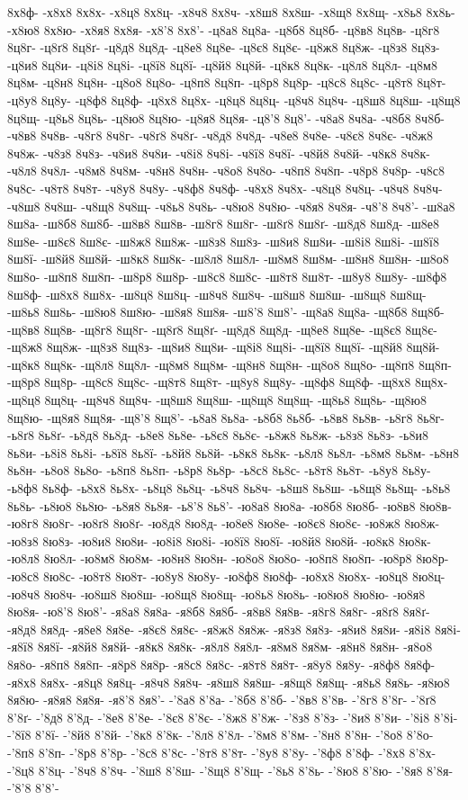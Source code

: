 {8х8ф-
-х8х8
8х8х-
-х8ц8
8х8ц-
-х8ч8
8х8ч-
-х8ш8
8х8ш-
-х8щ8
8х8щ-
-х8ь8
8х8ь-
-х8ю8
8х8ю-
-х8я8
8х8я-
-х8'8
8х8'-
-ц8а8
8ц8а-
-ц8б8
8ц8б-
-ц8в8
8ц8в-
-ц8г8
8ц8г-
-ц8ґ8
8ц8ґ-
-ц8д8
8ц8д-
-ц8е8
8ц8е-
-ц8є8
8ц8є-
-ц8ж8
8ц8ж-
-ц8з8
8ц8з-
-ц8и8
8ц8и-
-ц8і8
8ц8і-
-ц8ї8
8ц8ї-
-ц8й8
8ц8й-
-ц8к8
8ц8к-
-ц8л8
8ц8л-
-ц8м8
8ц8м-
-ц8н8
8ц8н-
-ц8о8
8ц8о-
-ц8п8
8ц8п-
-ц8р8
8ц8р-
-ц8с8
8ц8с-
-ц8т8
8ц8т-
-ц8у8
8ц8у-
-ц8ф8
8ц8ф-
-ц8х8
8ц8х-
-ц8ц8
8ц8ц-
-ц8ч8
8ц8ч-
-ц8ш8
8ц8ш-
-ц8щ8
8ц8щ-
-ц8ь8
8ц8ь-
-ц8ю8
8ц8ю-
-ц8я8
8ц8я-
-ц8'8
8ц8'-
-ч8а8
8ч8а-
-ч8б8
8ч8б-
-ч8в8
8ч8в-
-ч8г8
8ч8г-
-ч8ґ8
8ч8ґ-
-ч8д8
8ч8д-
-ч8е8
8ч8е-
-ч8є8
8ч8є-
-ч8ж8
8ч8ж-
-ч8з8
8ч8з-
-ч8и8
8ч8и-
-ч8і8
8ч8і-
-ч8ї8
8ч8ї-
-ч8й8
8ч8й-
-ч8к8
8ч8к-
-ч8л8
8ч8л-
-ч8м8
8ч8м-
-ч8н8
8ч8н-
-ч8о8
8ч8о-
-ч8п8
8ч8п-
-ч8р8
8ч8р-
-ч8с8
8ч8с-
-ч8т8
8ч8т-
-ч8у8
8ч8у-
-ч8ф8
8ч8ф-
-ч8х8
8ч8х-
-ч8ц8
8ч8ц-
-ч8ч8
8ч8ч-
-ч8ш8
8ч8ш-
-ч8щ8
8ч8щ-
-ч8ь8
8ч8ь-
-ч8ю8
8ч8ю-
-ч8я8
8ч8я-
-ч8'8
8ч8'-
-ш8а8
8ш8а-
-ш8б8
8ш8б-
-ш8в8
8ш8в-
-ш8г8
8ш8г-
-ш8ґ8
8ш8ґ-
-ш8д8
8ш8д-
-ш8е8
8ш8е-
-ш8є8
8ш8є-
-ш8ж8
8ш8ж-
-ш8з8
8ш8з-
-ш8и8
8ш8и-
-ш8і8
8ш8і-
-ш8ї8
8ш8ї-
-ш8й8
8ш8й-
-ш8к8
8ш8к-
-ш8л8
8ш8л-
-ш8м8
8ш8м-
-ш8н8
8ш8н-
-ш8о8
8ш8о-
-ш8п8
8ш8п-
-ш8р8
8ш8р-
-ш8с8
8ш8с-
-ш8т8
8ш8т-
-ш8у8
8ш8у-
-ш8ф8
8ш8ф-
-ш8х8
8ш8х-
-ш8ц8
8ш8ц-
-ш8ч8
8ш8ч-
-ш8ш8
8ш8ш-
-ш8щ8
8ш8щ-
-ш8ь8
8ш8ь-
-ш8ю8
8ш8ю-
-ш8я8
8ш8я-
-ш8'8
8ш8'-
-щ8а8
8щ8а-
-щ8б8
8щ8б-
-щ8в8
8щ8в-
-щ8г8
8щ8г-
-щ8ґ8
8щ8ґ-
-щ8д8
8щ8д-
-щ8е8
8щ8е-
-щ8є8
8щ8є-
-щ8ж8
8щ8ж-
-щ8з8
8щ8з-
-щ8и8
8щ8и-
-щ8і8
8щ8і-
-щ8ї8
8щ8ї-
-щ8й8
8щ8й-
-щ8к8
8щ8к-
-щ8л8
8щ8л-
-щ8м8
8щ8м-
-щ8н8
8щ8н-
-щ8о8
8щ8о-
-щ8п8
8щ8п-
-щ8р8
8щ8р-
-щ8с8
8щ8с-
-щ8т8
8щ8т-
-щ8у8
8щ8у-
-щ8ф8
8щ8ф-
-щ8х8
8щ8х-
-щ8ц8
8щ8ц-
-щ8ч8
8щ8ч-
-щ8ш8
8щ8ш-
-щ8щ8
8щ8щ-
-щ8ь8
8щ8ь-
-щ8ю8
8щ8ю-
-щ8я8
8щ8я-
-щ8'8
8щ8'-
-ь8а8
8ь8а-
-ь8б8
8ь8б-
-ь8в8
8ь8в-
-ь8г8
8ь8г-
-ь8ґ8
8ь8ґ-
-ь8д8
8ь8д-
-ь8е8
8ь8е-
-ь8є8
8ь8є-
-ь8ж8
8ь8ж-
-ь8з8
8ь8з-
-ь8и8
8ь8и-
-ь8і8
8ь8і-
-ь8ї8
8ь8ї-
-ь8й8
8ь8й-
-ь8к8
8ь8к-
-ь8л8
8ь8л-
-ь8м8
8ь8м-
-ь8н8
8ь8н-
-ь8о8
8ь8о-
-ь8п8
8ь8п-
-ь8р8
8ь8р-
-ь8с8
8ь8с-
-ь8т8
8ь8т-
-ь8у8
8ь8у-
-ь8ф8
8ь8ф-
-ь8х8
8ь8х-
-ь8ц8
8ь8ц-
-ь8ч8
8ь8ч-
-ь8ш8
8ь8ш-
-ь8щ8
8ь8щ-
-ь8ь8
8ь8ь-
-ь8ю8
8ь8ю-
-ь8я8
8ь8я-
-ь8'8
8ь8'-
-ю8а8
8ю8а-
-ю8б8
8ю8б-
-ю8в8
8ю8в-
-ю8г8
8ю8г-
-ю8ґ8
8ю8ґ-
-ю8д8
8ю8д-
-ю8е8
8ю8е-
-ю8є8
8ю8є-
-ю8ж8
8ю8ж-
-ю8з8
8ю8з-
-ю8и8
8ю8и-
-ю8і8
8ю8і-
-ю8ї8
8ю8ї-
-ю8й8
8ю8й-
-ю8к8
8ю8к-
-ю8л8
8ю8л-
-ю8м8
8ю8м-
-ю8н8
8ю8н-
-ю8о8
8ю8о-
-ю8п8
8ю8п-
-ю8р8
8ю8р-
-ю8с8
8ю8с-
-ю8т8
8ю8т-
-ю8у8
8ю8у-
-ю8ф8
8ю8ф-
-ю8х8
8ю8х-
-ю8ц8
8ю8ц-
-ю8ч8
8ю8ч-
-ю8ш8
8ю8ш-
-ю8щ8
8ю8щ-
-ю8ь8
8ю8ь-
-ю8ю8
8ю8ю-
-ю8я8
8ю8я-
-ю8'8
8ю8'-
-я8а8
8я8а-
-я8б8
8я8б-
-я8в8
8я8в-
-я8г8
8я8г-
-я8ґ8
8я8ґ-
-я8д8
8я8д-
-я8е8
8я8е-
-я8є8
8я8є-
-я8ж8
8я8ж-
-я8з8
8я8з-
-я8и8
8я8и-
-я8і8
8я8і-
-я8ї8
8я8ї-
-я8й8
8я8й-
-я8к8
8я8к-
-я8л8
8я8л-
-я8м8
8я8м-
-я8н8
8я8н-
-я8о8
8я8о-
-я8п8
8я8п-
-я8р8
8я8р-
-я8с8
8я8с-
-я8т8
8я8т-
-я8у8
8я8у-
-я8ф8
8я8ф-
-я8х8
8я8х-
-я8ц8
8я8ц-
-я8ч8
8я8ч-
-я8ш8
8я8ш-
-я8щ8
8я8щ-
-я8ь8
8я8ь-
-я8ю8
8я8ю-
-я8я8
8я8я-
-я8'8
8я8'-
-'8а8
8'8а-
-'8б8
8'8б-
-'8в8
8'8в-
-'8г8
8'8г-
-'8ґ8
8'8ґ-
-'8д8
8'8д-
-'8е8
8'8е-
-'8є8
8'8є-
-'8ж8
8'8ж-
-'8з8
8'8з-
-'8и8
8'8и-
-'8і8
8'8і-
-'8ї8
8'8ї-
-'8й8
8'8й-
-'8к8
8'8к-
-'8л8
8'8л-
-'8м8
8'8м-
-'8н8
8'8н-
-'8о8
8'8о-
-'8п8
8'8п-
-'8р8
8'8р-
-'8с8
8'8с-
-'8т8
8'8т-
-'8у8
8'8у-
-'8ф8
8'8ф-
-'8х8
8'8х-
-'8ц8
8'8ц-
-'8ч8
8'8ч-
-'8ш8
8'8ш-
-'8щ8
8'8щ-
-'8ь8
8'8ь-
-'8ю8
8'8ю-
-'8я8
8'8я-
-'8'8
8'8'-
}
